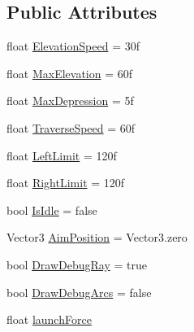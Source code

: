 \subsection*{Public Attributes}
\begin{DoxyCompactItemize}
\item 
float \hyperlink{class_turret_aim_ab6d11817dfff12c200f30a5b413922e1}{Elevation\+Speed} = 30f
\item 
float \hyperlink{class_turret_aim_abf4a6733d71b76f4c4c8e51fac0d979b}{Max\+Elevation} = 60f
\item 
float \hyperlink{class_turret_aim_abd337edc783d31d7c2eee320d8fa9934}{Max\+Depression} = 5f
\item 
float \hyperlink{class_turret_aim_a0d95f826ffb966894820a781ea3fc04c}{Traverse\+Speed} = 60f
\item 
float \hyperlink{class_turret_aim_af7cb89dae61664a964d7c4c036b93790}{Left\+Limit} = 120f
\item 
float \hyperlink{class_turret_aim_aa7ad1afe41386cc3b01ec42e150e767d}{Right\+Limit} = 120f
\item 
bool \hyperlink{class_turret_aim_aeda88b1a392e0ce59baf5720a641a0d5}{Is\+Idle} = false
\item 
Vector3 \hyperlink{class_turret_aim_a194f5413aa939b8cbb8a5a9edf2c8660}{Aim\+Position} = Vector3.\+zero
\item 
bool \hyperlink{class_turret_aim_abaf205533086a821c7d21c405134d1c0}{Draw\+Debug\+Ray} = true
\item 
bool \hyperlink{class_turret_aim_a58ca0c5ce58f7a29b44263efc23cc14f}{Draw\+Debug\+Arcs} = false
\item 
float \hyperlink{class_turret_aim_a37ec381a26ff942b851d343cad70aae6}{launch\+Force}
\end{DoxyCompactItemize}
